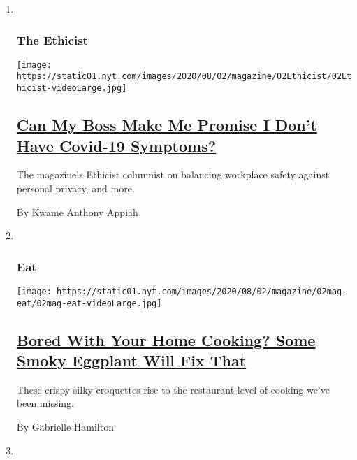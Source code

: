 \begin{enumerate}
\def\labelenumi{\arabic{enumi}.}
\item ~
  \hypertarget{the-ethicist}{%
  \subsubsection{The Ethicist}\label{the-ethicist}}

  \texttt{[image: https://static01.nyt.com/images/2020/08/02/magazine/02Ethicist/02Ethicist-videoLarge.jpg]}

  \hypertarget{can-my-boss-make-me-promise-i-dont-have-covid-19-symptoms}{%
  \subsection{\texorpdfstring{\href{/2020/07/28/magazine/can-my-boss-make-me-promise-i-dont-have-covid-19-symptoms.html}{Can
  My Boss Make Me Promise I Don't Have Covid-19
  Symptoms?}}{Can My Boss Make Me Promise I Don't Have Covid-19 Symptoms?}}\label{can-my-boss-make-me-promise-i-dont-have-covid-19-symptoms}}

  The magazine's Ethicist columnist on balancing workplace safety
  against personal privacy, and more.

  By Kwame Anthony Appiah
\item ~
  \hypertarget{eat}{%
  \subsubsection{Eat}\label{eat}}

  \texttt{[image: https://static01.nyt.com/images/2020/08/02/magazine/02mag-eat/02mag-eat-videoLarge.jpg]}

  \hypertarget{bored-with-your-home-cooking-some-smoky-eggplant-will-fix-that}{%
  \subsection{\texorpdfstring{\href{/2020/07/29/magazine/bored-with-your-home-cooking-some-smoky-eggplant-will-fix-that.html}{Bored
  With Your Home Cooking? Some Smoky Eggplant Will Fix
  That}}{Bored With Your Home Cooking? Some Smoky Eggplant Will Fix That}}\label{bored-with-your-home-cooking-some-smoky-eggplant-will-fix-that}}

  These crispy-silky croquettes rise to the restaurant level of cooking
  we've been missing.

  By Gabrielle Hamilton
\item ~
  \hypertarget{talk-1}{%
}
\end{enumerate}
